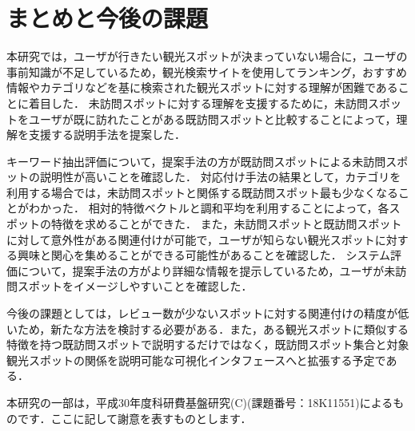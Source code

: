 \documentclass[submit]{ipsj}
\begin{document}
\section{まとめと今後の課題}
\label{sec:まとめと今後の課題}

本研究では，ユーザが行きたい観光スポットが決まっていない場合に，ユーザの事前知識が不足しているため，観光検索サイトを使用してランキング，おすすめ情報やカテゴリなどを基に検索された観光スポットに対する理解が困難であることに着目した．
未訪問スポットに対する理解を支援するために，未訪問スポットをユーザが既に訪れたことがある既訪問スポットと比較することによって，理解を支援する説明手法を提案した．

キーワード抽出評価について，提案手法の方が既訪問スポットによる未訪問スポットの説明性が高いことを確認した．
対応付け手法の結果として，カテゴリを利用する場合では，未訪問スポットと関係する既訪問スポット最も少なくなることがわかった．
相対的特徴ベクトルと調和平均を利用することによって，各スポットの特徴を求めることができた．
また，未訪問スポットと既訪問スポットに対して意外性がある関連付けが可能で，ユーザが知らない観光スポットに対する興味と関心を集めることができる可能性があることを確認した．
システム評価について，提案手法の方がより詳細な情報を提示しているため，ユーザが未訪問スポットをイメージしやすいことを確認した．

今後の課題としては，レビュー数が少ないスポットに対する関連付けの精度が低いため，新たな方法を検討する必要がある．また，ある観光スポットに類似する特徴を持つ既訪問スポットで説明するだけではなく，既訪問スポット集合と対象観光スポットの関係を説明可能な可視化インタフェースへと拡張する予定である．

\begin{acknowledgment}
本研究の一部は，平成30年度科研費基盤研究(C)(課題番号：18K11551)によるものです．ここに記して謝意を表すものとします．
\end{acknowledgment}
\end{document}
